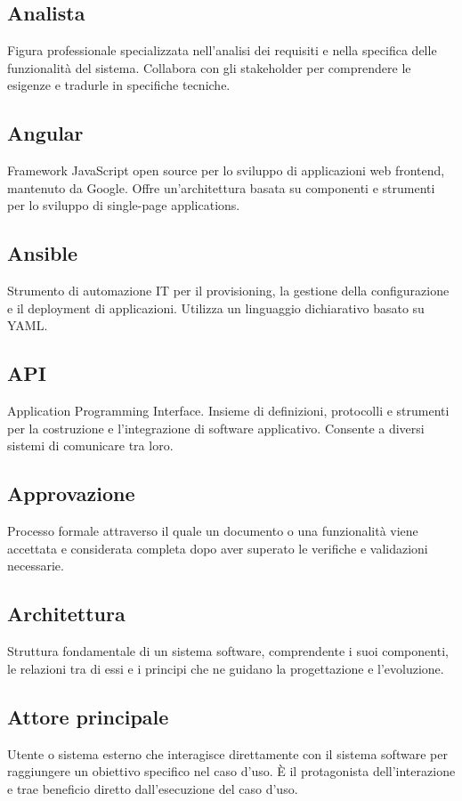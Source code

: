 \documentclass[a4paper,11pt]{article}
\begin{document}
\subsection{Analista}
Figura professionale specializzata nell'analisi dei requisiti e nella specifica delle funzionalità del sistema. Collabora con gli stakeholder per comprendere le esigenze e tradurle in specifiche tecniche.

\subsection{Angular}
Framework JavaScript open source per lo sviluppo di applicazioni web frontend, mantenuto da Google. Offre un'architettura basata su componenti e strumenti per lo sviluppo di single-page applications.

\subsection{Ansible}
Strumento di automazione IT per il provisioning, la gestione della configurazione e il deployment di applicazioni. Utilizza un linguaggio dichiarativo basato su YAML.

\subsection{API}
Application Programming Interface. Insieme di definizioni, protocolli e strumenti per la costruzione e l'integrazione di software applicativo. Consente a diversi sistemi di comunicare tra loro.

\subsection{Approvazione}
Processo formale attraverso il quale un documento o una funzionalità viene accettata e considerata completa dopo aver superato le verifiche e validazioni necessarie.

\subsection{Architettura}
Struttura fondamentale di un sistema software, comprendente i suoi componenti, le relazioni tra di essi e i principi che ne guidano la progettazione e l'evoluzione.

\subsection{Attore principale}
Utente o sistema esterno che interagisce direttamente con il sistema software per raggiungere un obiettivo specifico nel caso d'uso. È il protagonista dell'interazione e trae beneficio diretto dall'esecuzione del caso d'uso.
\end{document}
